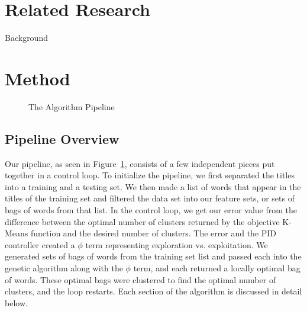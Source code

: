 \documentclass{sig-alternate}
\begin{document}
\section{Related Research}
Background

\section{Method}
\begin{figure}[t]
\centering
{}
\caption{The Algorithm Pipeline}
\label{fig:pipeline}
\end{figure}
\subsection{Pipeline Overview}
Our pipeline, as seen in Figure~\ref{fig:pipeline}, consists of a few independent pieces put together in a control loop. To initialize the pipeline, we first separated the titles into a training and a testing set. We then made a list of words that appear in the titles of the training set and filtered the data set into our feature sets, or sets of bags of words from that list. In the control loop, we get our error value from the difference between the optimal number of clusters returned by the objective K-Means function and the desired number of clusters. The error and the PID controller created a $\phi$ term representing exploration vs. exploitation. We generated sets of bags of words from the training set list and passed each into the genetic algorithm along with the $\phi$ term, and each returned a locally optimal bag of words. These optimal bags were clustered to find the optimal number of clusters, and the loop restarts. Each section of the algorithm is discussed in detail below.
\end{document}
